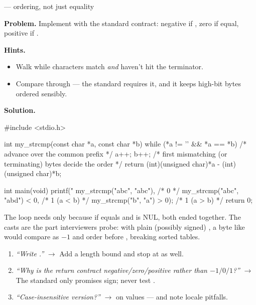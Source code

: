 \begin{gymproblem}{ --- ordering, not just equality}

\textbf{Problem.} Implement
 with the standard
contract: negative if , zero if equal, positive if .

\textbf{Hints.}
\begin{itemize}
\item Walk while characters match \emph{and} haven't hit the terminator.
\item Compare through  --- the standard requires it, and
  it keeps high-bit bytes ordered sensibly.
\end{itemize}

\attempt

\textbf{Solution.}
\begin{cgym}
#include <stdio.h>

int my_strcmp(const char *a, const char *b) {
    while (*a != '\0' && *a == *b) {    /* advance over the common prefix     */
        a++;
        b++;
    }
    /* first mismatching (or terminating) bytes decide the order */
    return (int)(unsigned char)*a - (int)(unsigned char)*b;
}

int main(void) {
    printf("%
           my_strcmp("abc", "abc"),       /* 0          */
           my_strcmp("abc", "abd") < 0,   /* 1 (a < b)  */
           my_strcmp("b", "a") > 0);      /* 1 (a > b)  */
    return 0;
}
\end{cgym}

The loop needs only  because if 
equals  and  is NUL, both ended together. The
 casts are the part interviewers probe: with plain
(possibly signed) , a byte like  would compare as
$-1$ and order before , breaking sorted tables.

\followups
\begin{enumerate}
\item \emph{``Write .''} $\rightarrow$ Add a length bound and
  stop at  as well.
\item \emph{``Why is the return contract negative/zero/positive rather than
  $-1/0/1$?''} $\rightarrow$ The standard only promises sign; never test
  .
\item \emph{``Case-insensitive version?''} $\rightarrow$  on
   values --- and note locale pitfalls.
\end{enumerate}
\end{gymproblem}

